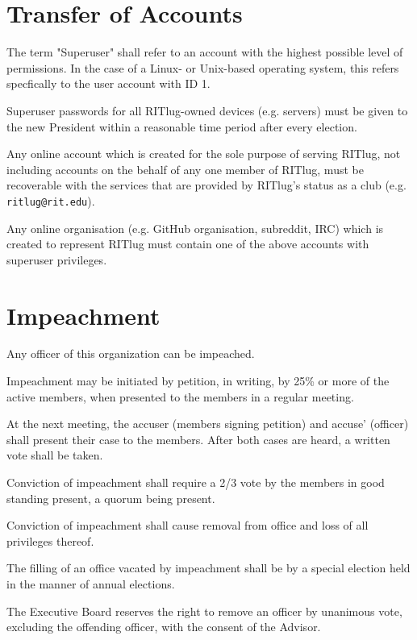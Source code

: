 \section{Transfer of Accounts}
\begin{subroutines}
\item The term "Superuser" shall refer to an account with the highest possible level of permissions. In the case of a Linux- or Unix-based operating system, this refers specfically to the user account with ID 1.
\item Superuser passwords for all RITlug-owned devices (e.g. servers) must be given to the new President within a reasonable time period after every election.
\item Any online account which is created for the sole purpose of serving RITlug, not including accounts on the behalf of any one member of RITlug, must be recoverable with the services that are provided by RITlug's status as a club (e.g. \texttt{ritlug@rit.edu}).
\item Any online organisation (e.g. GitHub organisation, subreddit, IRC) which is created to represent RITlug must contain one of the above accounts with superuser privileges.
\end{subroutines}

\section{Impeachment}
\begin{subroutines}
\item Any officer of this organization can be impeached.
\item Impeachment may be initiated by petition, in writing, by 25\% or more of the active members, when presented to the members in a regular meeting.
\item At the next meeting, the accuser (members signing petition) and accuse’ (officer) shall present their case to the members. After both cases are heard, a written vote shall be taken.
\item Conviction of impeachment shall require a 2/3 vote by the members in good standing present, a quorum being present.
\item Conviction of impeachment shall cause removal from office and loss of all privileges thereof.
\item The filling of an office vacated by impeachment shall be by a special election held in the manner of annual elections.
\item The Executive Board reserves the right to remove an officer by unanimous vote, excluding the offending officer, with the consent of the Advisor.
\end{subroutines}

